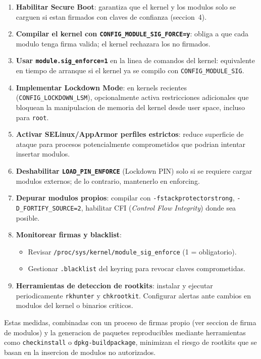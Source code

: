 \begin{enumerate}[label=\arabic*.]
  \item \textbf{Habilitar Secure Boot}: garantiza que el kernel y los modulos solo se carguen si estan firmados con claves de confianza (seccion~4).
  \item \textbf{Compilar el kernel con \texttt{CONFIG\_MODULE\_SIG\_FORCE=y}}: obliga a que cada modulo tenga firma valida; el kernel rechazara los no firmados.
  \item \textbf{Usar \texttt{module.sig\_enforce=1}} en la linea de comandos del kernel: equivalente en tiempo de arranque si el kernel ya se compilo con \texttt{CONFIG\_MODULE\_SIG}.
  \item \textbf{Implementar Lockdown Mode}: en kernels recientes (\texttt{CONFIG\_LOCKDOWN\_LSM}), opcionalmente activa restricciones adicionales que bloquean la manipulacion de memoria del kernel desde user space, incluso para \texttt{root}.
  \item \textbf{Activar SELinux/AppArmor perfiles estrictos}: reduce superficie de ataque para procesos potencialmente comprometidos que podrian intentar insertar modulos.
  \item \textbf{Deshabilitar \texttt{LOAD\_PIN\_ENFORCE}} (Lockdown PIN) solo si se requiere cargar modulos externos; de lo contrario, mantenerlo en enforcing.
  \item \textbf{Depurar modulos propios}: compilar con \texttt{-fstack\-protector\-strong}, \texttt{-D\_FORTIFY\_SOURCE=2}, habilitar CFI (\textit{Control Flow Integrity}) donde sea posible.
  \item \textbf{Monitorear firmas y blacklist}:
    \begin{itemize}[nosep]
      \item Revisar \texttt{/proc/sys/kernel/module\_sig\_enforce} (1 = obligatorio).
      \item Gestionar \texttt{.blacklist} del keyring para revocar claves comprometidas.
    \end{itemize}
  \item \textbf{Herramientas de deteccion de rootkits}: instalar y ejecutar periodicamente \texttt{rkhunter} y \texttt{chkrootkit}. Configurar alertas ante cambios en modulos del kernel o binarios criticos.
\end{enumerate}

Estas medidas, combinadas con un proceso de firmas propio (ver seccion de firma de modulos) y la generacion de paquetes reproducibles mediante herramientas como \texttt{checkinstall} o \texttt{dpkg-buildpackage}, minimizan el riesgo de rootkits que se basan en la insercion de modulos no autorizados.



